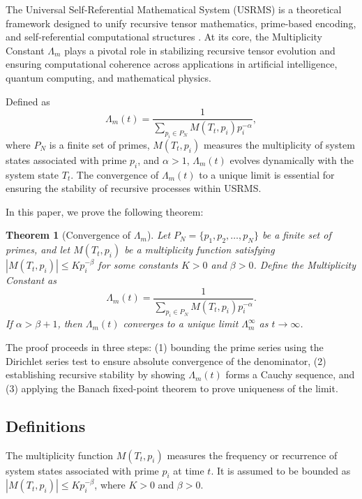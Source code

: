 \documentclass{article}
\theoremstyle{plain}
\newtheorem{theorem}{Theorem}
\begin{document}
The Universal Self-Referential Mathematical System (USRMS) is a theoretical framework designed to unify recursive tensor mathematics, prime-based encoding, and self-referential computational structures \cite{USRMS2023}. At its core, the Multiplicity Constant \( \Lambda_m \) plays a pivotal role in stabilizing recursive tensor evolution and ensuring computational coherence across applications in artificial intelligence, quantum computing, and mathematical physics.

Defined as
\[
\Lambda_m(t) = \frac{1}{\sum_{p_i \in P_N} M(T_t, p_i) p_i^{-\alpha}},
\]
where \( P_N \) is a finite set of primes, \( M(T_t, p_i) \) measures the multiplicity of system states associated with prime \( p_i \), and \( \alpha > 1 \), \( \Lambda_m(t) \) evolves dynamically with the system state \( T_t \). The convergence of \( \Lambda_m(t) \) to a unique limit is essential for ensuring the stability of recursive processes within USRMS.

In this paper, we prove the following theorem:

\begin{theorem}[Convergence of \( \Lambda_m \)]
\label{thm:convergence}
Let \( P_N = \{ p_1, p_2, \dots, p_N \} \) be a finite set of primes, and let \( M(T_t, p_i) \) be a multiplicity function satisfying \( |M(T_t, p_i)| \leq K p_i^{-\beta} \) for some constants \( K > 0 \) and \( \beta > 0 \). Define the Multiplicity Constant as
\[
\Lambda_m(t) = \frac{1}{\sum_{p_i \in P_N} M(T_t, p_i) p_i^{-\alpha}}.
\]
If \( \alpha > \beta + 1 \), then \( \Lambda_m(t) \) converges to a unique limit \( \Lambda_m^{\infty} \) as \( t \to \infty \).
\end{theorem}

The proof proceeds in three steps: (1) bounding the prime series using the Dirichlet series test to ensure absolute convergence of the denominator, (2) establishing recursive stability by showing \( \Lambda_m(t) \) forms a Cauchy sequence, and (3) applying the Banach fixed-point theorem to prove uniqueness of the limit.

\subsection{Definitions}

\begin{definition}
\label{def:multiplicity}
The multiplicity function \( M(T_t, p_i) \) measures the frequency or recurrence of system states associated with prime \( p_i \) at time \( t \). It is assumed to be bounded as \( |M(T_t, p_i)| \leq K p_i^{-\beta} \), where \( K > 0 \) and \( \beta > 0 \).
\end{definition}
\end{document}
